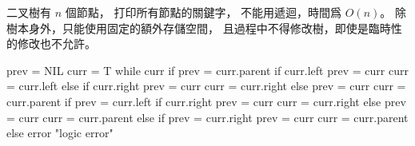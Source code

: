 \startEXERCISE\DIFFICULT
二叉樹有 $n$ 個節點，
打印所有節點的關鍵字，
不能用遞迴，時間爲 $O(n)$。
除樹本身外，只能使用固定的額外存儲空間，
且過程中不得修改樹，即使是臨時性的修改也不允許。
\stopEXERCISE

\startANSWER
{}
\startCLRSCODE
prev = NIL
curr = T
while curr
	if prev = curr.parent
		if curr.left
			prev = curr
			curr = curr.left
		else
			if curr.right
				prev = curr
				curr = curr.right
			else
				prev = curr
				curr = curr.parent
	if prev = curr.left
		if curr.right
			prev = curr
			curr = curr.right
		else
			prev = curr
			curr = curr.parent
	else if prev = curr.right
		prev = curr
		curr = curr.parent
	else
		error "logic error"
\stopCLRSCODE
\stopANSWER
